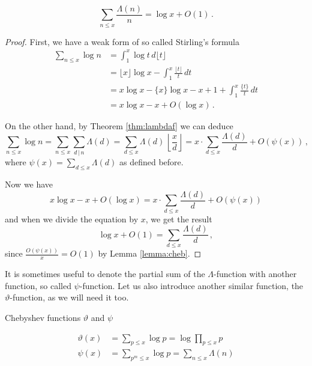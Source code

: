 \documentclass{article}
\begin{document}
\begin{lemma}
\label{lemma:lambdadd}
\begin{equation*}
    \sum_{n\leq x} \frac{\Lambda(n)}{n} = \log x + O(1)\,.
\end{equation*}
\begin{proof}
First, we have a weak form of so called Stirling's formula \cite{Goldmakher}
\begin{align*}
    \sum_{n\leq x} \log n & = \int_1^x \log t\,d\lfloor t\rfloor\\
    & = \lfloor x\rfloor\log x - \int_1^x \frac{\lfloor t \rfloor}{t}\,dt\\
    & = x\log x - \{x\}\log x - x + 1 + \int_1^x \frac{\{t\}}{t}\,dt\\
    & = x\log x - x + O(\log x)\,.
\end{align*}

On the other hand, by Theorem \ref{thm:lambdaf} we can deduce
\begin{equation*}
    \sum_{n\leq x} \log n = \sum_{n\leq x} \sum_{d\,\vert\, n} \Lambda(d) = \sum_{d\leq x} \Lambda(d)\,\left\lfloor \frac{x}{d}\right\rfloor = x\cdot\sum_{d\leq x} \frac{\Lambda(d)}{d} + O(\psi(x))\,,
\end{equation*}
where $\psi(x)=\sum_{d\leq x} \Lambda(d)$ as defined before.

Now we have
\begin{equation*}
    x\log x - x + O(\log x) = x\cdot\sum_{d\leq x} \frac{\Lambda(d)}{d} + O(\psi(x))
\end{equation*}
and when we divide the equation by $x$, we get the result
\begin{equation*}
    \log x + O(1) = \sum_{d\leq x} \frac{\Lambda(d)}{d}\,,
\end{equation*}
since $\frac{O(\psi(x))}{x}=O(1)$ by Lemma \ref{lemma:cheb}.
\end{proof}
\end{lemma}

It is sometimes useful to denote the partial sum of the $\Lambda$-function with another function, so called $\psi$-function. Let us also introduce another similar function, the $\vartheta$-function, as we will need it too.

\begin{definition}
Chebyshev functions $\vartheta$ and $\psi$

\begin{align*}
     \vartheta(x) & = \sum_{p\leq x} \log p = \log \prod_{p\leq x} p\\
    \psi(x) & = \sum_{p^m\leq x} \log p = \sum_{n\leq x} \Lambda(n)
\end{align*}
\end{definition}
\end{document}
